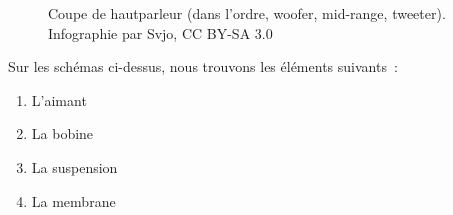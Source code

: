 \documentclass[
  letterpaper,
  DIV=11,
  numbers=noendperiod]{scrreprt}
\providecommand{\tightlist}{%
  \setlength{\itemsep}{0pt}\setlength{\parskip}{0pt}}\usepackage{longtable,booktabs,array}
\begin{document}
\begin{figure}
\begin{minipage}[t]{0.33\linewidth}
{{}

}

\end{minipage}%
%
\begin{minipage}[t]{0.33\linewidth}

{\centering 


}

\end{minipage}%

\caption{\label{fig-hp}Coupe de hautparleur (dans l'ordre, woofer,
mid-range, tweeter). Infographie par Svjo, CC BY-SA 3.0}

\end{figure}

Sur les schémas ci-dessus, nous trouvons les éléments suivants~:

\begin{enumerate}
\def\labelenumi{\arabic{enumi}.}
\tightlist
\item
  L'aimant
\item
  La bobine
\item
  La suspension
\item
  La membrane
\end{enumerate}
\end{document}
